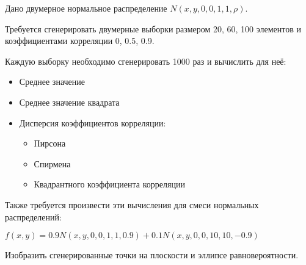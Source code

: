 Дано двумерное нормальное распределение $N(x, y, 0, 0, 1, 1, \rho)$.

Требуется сгенерировать двумерные выборки размером 20, 60, 100 элементов и коэффициентами корреляции 0, 0.5, 0.9.

Каждую выборку необходимо сгенерировать 1000 раз и вычислить для неё:
\begin{itemize}
	\item Среднее значение
	\item Среднее значение квадрата
	\item Дисперсия коэффициентов корреляции:
	\begin{itemize}
		\item Пирсона
		\item Спирмена
		\item Квадрантного коэффициента корреляции
	\end{itemize}
\end{itemize}

Также требуется произвести эти вычисления для смеси нормальных распределений:

$f(x, y) = 0.9N(x, y, 0, 0, 1, 1, 0.9) + 0.1N(x, y, 0, 0, 10, 10, -0.9)$

Изобразить сгенерированные точки на плоскости и эллипсе равновероятности.	